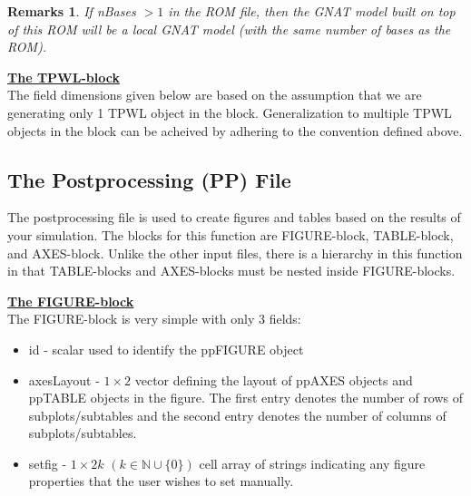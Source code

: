 \documentclass[notitlepage]{report}
\newtheorem*{Rem}{Remarks}
\newcommand{\NN}{\ensuremath{\mathbb{N} }}
\begin{document}
\begin{Rem}
If nBases $> 1$ in the ROM file, then the GNAT model built on top of this ROM will be a local GNAT model (with the same number of bases as the ROM). 
\end{Rem}

\vspace{2mm}
\noindent \underline{\textbf{The TPWL-block}} \\
The field dimensions given below are based on the assumption that we are generating only 1 TPWL object in the block.  Generalization to multiple TPWL objects in the block can be acheived by adhering to the convention defined above.

\subsection{The Postprocessing (PP) File}
The postprocessing file is used to create figures and tables based on the results of  your simulation.
The blocks for this function are FIGURE-block, TABLE-block, and AXES-block.  Unlike the other input files, there is a hierarchy in this function in that TABLE-blocks and AXES-blocks must be nested inside FIGURE-blocks.

\vspace{2mm}
\noindent \underline{\textbf{The FIGURE-block}} \\
The FIGURE-block is very simple with only 3 fields:
\begin{itemize}
  \item id - scalar used to identify the ppFIGURE object
  \item axesLayout - $1 \times 2$ vector defining the layout of ppAXES objects and ppTABLE objects in the figure.  The first entry denotes the number of rows of subplots/subtables and the second entry denotes the number of columns of subplots/subtables.
  \item setfig - $1 \times 2k$ $(k \in \NN\cup\{0\})$ cell array of strings indicating any figure properties that the user wishes to set manually.
\end{itemize}
\end{document}

